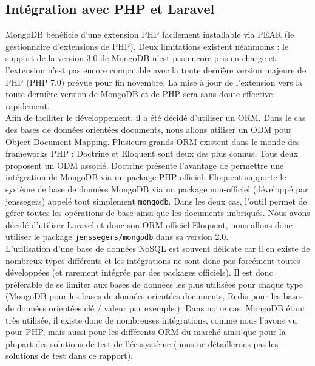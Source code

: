 \subsection{Intégration avec PHP et Laravel}%
\label{sub:integration_avec_php_et_laravel}

	MongoDB bénéficie d'une extension PHP facilement installable via PEAR (le gestionnaire d'extensions de PHP). Deux limitations existent néanmoins : le support de la version 3.0 de MongoDB n'est pas encore pris en charge et l'extension n'est pas encore compatible avec la toute dernière version majeure de PHP (PHP 7.0) prévue pour fin novembre. La mise à jour de l'extension vers la toute dernière version de MongoDB et de PHP sera sans doute effective rapidement.\\

	Afin de faciliter le développement, il a été décidé d'utiliser un ORM. Dans le cas des bases de données orientées documents, nous allons utiliser un ODM pour Object Document Mapping. Plusieurs grands ORM existent dans le monde des frameworks PHP : Doctrine et Eloquent sont deux des plus connus. Tous deux proposent un ODM associé. Doctrine présente l'avantage de permettre une intégration de MongoDB via un package PHP officiel. Eloquent supporte le système de base de données MongoDB via un package non-officiel (développé par jenssegers) appelé tout simplement \verb|mongodb|. Dans les deux cas, l'outil permet de gérer toutes les opérations de base ainsi que les documents imbriqués. Nous avons décidé d'utiliser Laravel et donc son ORM officiel Eloquent, nous allons donc utiliser le package \verb|jenssegers/mongodb| dans sa version 2.0.\\

	L'utilisation d'une base de données NoSQL est souvent délicate car il en existe de nombreux types différents et les intégrations ne sont donc pas forcément toutes développées (et rarement intégrée par des packages officiels). Il est donc préférable de se limiter aux bases de données les plus utilisées pour chaque type (MongoDB pour les bases de données orientées documents, Redis pour les bases de données orientées clé / valeur par exemple.). Dans notre cas, MongoDB étant très utilisée, il existe donc de nombreuses intégrations, comme nous l'avons vu pour PHP, mais aussi pour les différents ORM du marché ainsi que pour la plupart des solutions de test de l'écosystème (nous ne détaillerons pas les solutions de test dans ce rapport).


